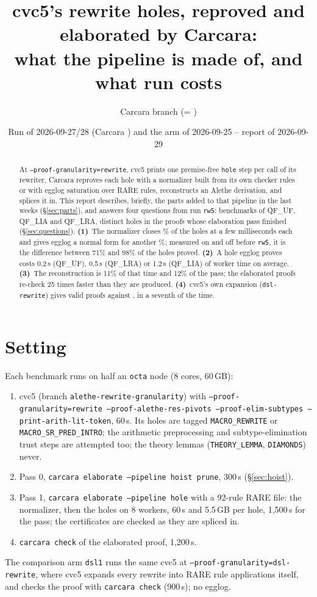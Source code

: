 \documentclass[11pt,a4paper]{article}
\title{cvc5's rewrite holes, reproved and elaborated by Carcara:\\
  what the pipeline is made of, and what run \code{rw5} costs}
\author{Carcara branch \code{egglog/rewrite-holes} (= \code{egglog/bounded-parallel-holes})}
\date{Run \code{rw5} of 2026-09-27/28 (Carcara \code{7ec65b7d}) and the
  \code{dsl1} arm of 2026-09-25 -- report of 2026-09-29}
\newcommand{\UF}{QF\_UF}
\newcommand{\LIA}{QF\_LIA}
\newcommand{\LRA}{QF\_LRA}
\newcommand{\code}[1]{\texttt{#1}}
\begin{document}
\maketitle

\begin{abstract}
  At \code{--proof-granularity=rewrite}, cvc5 prints one premise-free
  \code{hole} step per call of its rewriter. Carcara reproves each hole with
  a normalizer built from its own checker rules or with egglog saturation
  over RARE rules, reconstructs an Alethe derivation, and splices it in.
  This report describes, briefly, the parts added to that pipeline in the
  last weeks (\S\ref{sec:parts}), and answers four questions from run
  \code{rw5}: \nbench{} benchmarks of \UF{}, \LIA{} and \LRA{}, \nholes{}
  distinct holes in the \nran{} proofs whose elaboration pass finished
  (\S\ref{sec:questions}). \textbf{(1)}~The normalizer closes
  \closedshare\% of the holes at a few milliseconds each and gives egglog a
  normal form for another \triedshare\%; measured on and off before
  \code{rw5}, it is the difference between 71\% and 98\% of the holes
  proved. \textbf{(2)}~A hole egglog proves costs 0.2\,s (\UF{}), 0.5\,s
  (\LRA{}) or 1.2\,s (\LIA{}) of worker time on average. \textbf{(3)}~The
  reconstruction is 11\% of that time and 12\% of the pass; the elaborated
  proofs re-check 25 times faster than they are produced.
  \textbf{(4)}~cvc5's own expansion (\code{dsl-rewrite}) gives \dslvalid{}
  valid proofs against \rwvalid{}, in a seventh of the time.
\end{abstract}

\section{Setting}

Each benchmark runs on half an \code{octa} node (8 cores, 60\,GB):
\begin{enumerate}
  \item cvc5 (branch \code{alethe-rewrite-granularity}) with
    \code{--proof-granularity=rewrite --proof-alethe-res-pivots
    --proof-elim-subtypes --print-arith-lit-token}, 60\,s. Its holes are
    tagged \code{MACRO\_REWRITE} or \code{MACRO\_SR\_PRED\_INTRO}; the
    arithmetic preprocessing and subtype-elimination trust steps are
    attempted too; the theory lemmas (\code{THEORY\_LEMMA}, \code{DIAMONDS})
    never.
  \item Pass 0, \code{carcara elaborate --pipeline hoist prune}, 300\,s
    (\S\ref{sec:hoist}).
  \item Pass 1, \code{carcara elaborate --pipeline hole} with a 92-rule RARE
    file: the normalizer, then the holes on 8 workers, 60\,s and 5.5\,GB per
    hole, 1,500\,s for the pass; the certificates are checked as they are
    spliced in.
  \item \code{carcara check} of the elaborated proof, 1,200\,s.
\end{enumerate}
The comparison arm \code{dsl1} runs the same cvc5 at
\code{--proof-granularity=dsl-rewrite}, where cvc5 expands every rewrite
into RARE rule applications itself, and checks the proof with
\code{carcara check} (900\,s); no egglog.
\end{document}
